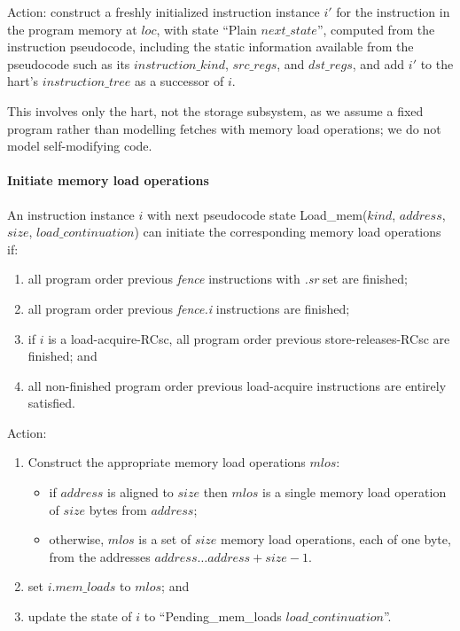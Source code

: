 Action: construct a freshly initialized instruction instance $i'$ for the instruction in the program memory at $loc$, with state ``{\sc Plain} $next\_state$'', computed from the instruction pseudocode, including the static information available from the pseudocode such as its $instruction\_kind$, $src\_regs$, and $dst\_regs$, and add $i'$ to the hart's $instruction\_tree$ as a successor of $i$.

\begin{commentary}
This involves only the hart, not the storage subsystem, as we assume a fixed program rather than modelling fetches with memory load operations; we do not model self-modifying code.
\end{commentary}


\paragraph{Initiate memory load operations}\label{omm:hart:initiate_mem_read}
An instruction instance $i$ with next pseudocode state {\sc Load\_mem}($kind$, $address$, $size$, $load\_continuation$) can initiate the corresponding memory load operations if:
\begin{enumerate}
\item all program order previous {\em fence} instructions with {\em .sr} set are finished;
\item all program order previous {\em fence.i} instructions are finished; 
\item if $i$ is a load-acquire-RCsc, all program order previous store-releases-RCsc are finished; and
\item all non-finished program order previous load-acquire instructions are entirely satisfied.
\end{enumerate}
Action:
\begin{enumerate}
\item Construct the appropriate memory load operations $mlos$:
  \begin{itemize}
  \item if $address$ is aligned to $size$ then $mlos$ is a single memory load operation of $size$ bytes from $address$;
  \item otherwise, $mlos$ is a set of $size$ memory load operations, each of one byte, from the addresses $address\ldots address+size-1$.
  \end{itemize}
\item set $i.mem\_loads$ to $mlos$; and
\item update the state of $i$ to ``{\sc Pending\_mem\_loads} $load\_continuation$''.
\end{enumerate}

